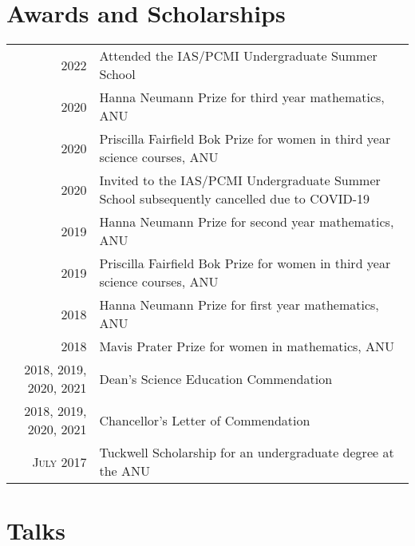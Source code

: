 \documentclass[a4paper,10pt]{article} %
\begin{document}
\section{Awards and Scholarships}

\begin{tabular}{rl}
2022 & Attended the IAS/PCMI Undergraduate Summer School\\

2020 & Hanna Neumann Prize \footnotesize for third year mathematics, ANU \normalsize\\

2020 & Priscilla Fairfield Bok Prize \footnotesize for women in third year science courses, ANU \normalsize\\

2020 & Invited to the IAS/PCMI Undergraduate Summer School \footnotesize subsequently cancelled due to COVID-19\\

2019 & Hanna Neumann Prize \footnotesize for second year mathematics, ANU \normalsize\\

2019 & Priscilla Fairfield Bok Prize \footnotesize for women in third year science courses, ANU \normalsize\\

2018 & Hanna Neumann Prize \footnotesize for first year mathematics, ANU \normalsize\\

2018 & Mavis Prater Prize \footnotesize for women in mathematics, ANU \normalsize\\

2018, 2019, 2020, 2021 & Dean's Science Education Commendation\\

2018, 2019, 2020, 2021 & Chancellor's Letter of Commendation\\

\textsc{July} 2017 & Tuckwell Scholarship \footnotesize for an undergraduate degree at the ANU\\

\end{tabular}


\section{Talks}
\end{document}
